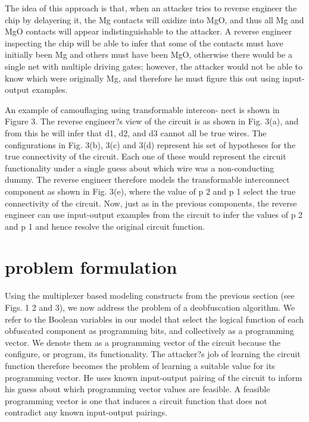 \documentclass[proposal]{umassthesis}  %
\begin{document}
The idea of this approach is that, when an attacker tries to reverse engineer the chip by delayering it, the Mg contacts will oxidize into MgO, and thus all Mg and MgO contacts will appear indistinguishable to the attacker. A reverse engineer inspecting the chip will be able to infer that some of the contacts must have initially been Mg and others must have been MgO, otherwise there would be a single net with multiple driving gates; however, the attacker would not be able to know which were originally Mg, and therefore he must figure this out using input-output examples.

An example of camouflaging using transformable intercon- nect is shown in Figure 3. The reverse engineer?s view of the circuit is as shown in Fig. 3(a), and from this he will infer that d1, d2, and d3 cannot all be true wires. The configurations in Fig. 3(b), 3(c) and 3(d) represent his set of hypotheses for the true connectivity of the circuit. Each one of these would represent the circuit functionality under a single guess about which wire was a non-conducting dummy. The reverse engineer therefore models the transformable interconnect component as shown in Fig. 3(e), where the value of p 2 and p 1 select the true connectivity of the circuit. Now, just as in the previous components, the reverse engineer can use input-output examples from the circuit to infer the values of p 2 and p 1 and hence resolve the original circuit function.

\section{problem formulation}
Using the multiplexer based modeling constructs from the previous section (see Figs. 1 2 and 3), we now address the problem of a deobfuscation algorithm. We refer to the Boolean variables in our model that select the logical function of each obfuscated component as programming bits, and collectively as a programming vector. We denote them as a programming vector of the circuit because the configure, or program, its functionality. The attacker?s job of learning the circuit function therefore becomes the problem of learning a suitable value for its programming vector. He uses known input-output pairing of the circuit to inform his guess about which programming vector values are feasible. A feasible programming vector is one that induces a circuit function that does not contradict any known input-output pairings.
\end{document}
